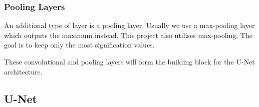 \documentclass[12pt]{article}
\begin{document}

\subsubsection*{Pooling Layers}




An additional type of layer is a pooling layer. Usually we use a max-pooling layer which outputs the maximum instead. This project also utilises max-pooling. The goal is to keep only the most signification values.

These convolutional and pooling layers will form the building block for the U-Net architecture.









\subsection{U-Net}

\end{document}
